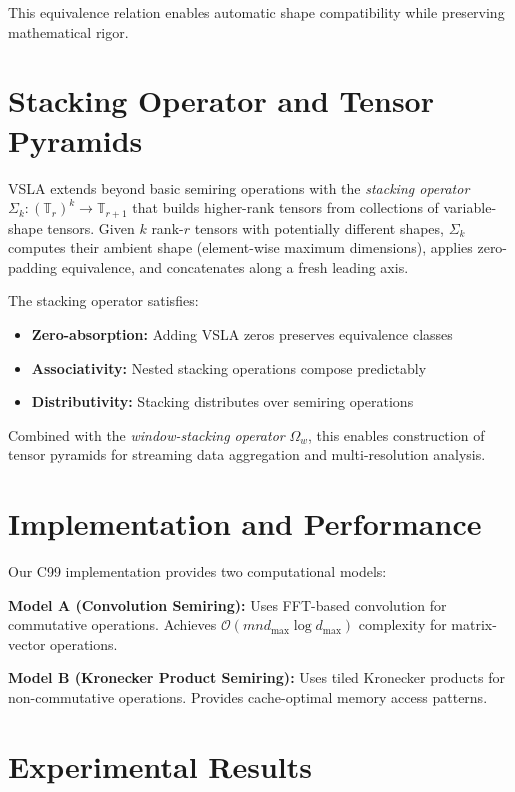 \documentclass[11pt,twocolumn]{article}
\begin{document}
This equivalence relation enables automatic shape compatibility while preserving mathematical rigor.

\section{Stacking Operator and Tensor Pyramids}

VSLA extends beyond basic semiring operations with the \emph{stacking operator} $\Sigma_k: (\mathbb{T}_r)^k \rightarrow \mathbb{T}_{r+1}$ that builds higher-rank tensors from collections of variable-shape tensors. Given $k$ rank-$r$ tensors with potentially different shapes, $\Sigma_k$ computes their ambient shape (element-wise maximum dimensions), applies zero-padding equivalence, and concatenates along a fresh leading axis.

The stacking operator satisfies:
\begin{itemize}
\item \textbf{Zero-absorption:} Adding VSLA zeros preserves equivalence classes
\item \textbf{Associativity:} Nested stacking operations compose predictably  
\item \textbf{Distributivity:} Stacking distributes over semiring operations
\end{itemize}

Combined with the \emph{window-stacking operator} $\Omega_w$, this enables construction of tensor pyramids for streaming data aggregation and multi-resolution analysis.

\section{Implementation and Performance}

Our C99 implementation provides two computational models:

\textbf{Model A (Convolution Semiring):} Uses FFT-based convolution for commutative operations. Achieves $\mathcal{O}(mn d_{\max} \log d_{\max})$ complexity for matrix-vector operations.

\textbf{Model B (Kronecker Product Semiring):} Uses tiled Kronecker products for non-commutative operations. Provides cache-optimal memory access patterns.

\section{Experimental Results}
\end{document}
